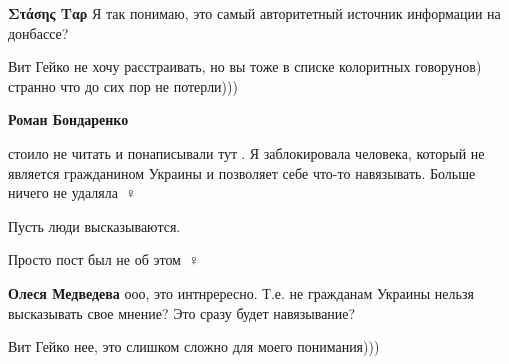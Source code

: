\begin{itemize}
\begin{itemize}
 
\textbf{Στάσης Ταρ} Я так понимаю, это самый авторитетный источник информации на донбассе?

 
Вит Гейко не хочу расстраивать, но вы тоже в списке колоритных говорунов) странно что до сих пор не потерли)))

 
\textbf{Роман Бондаренко} 

стоило не читать и понаписывали тут🤣. Я заблокировала человека, который не
является гражданином Украины и позволяет себе что-то навязывать. Больше ничего
не удаляла🤷🏼♀️

Пусть люди высказываются.

Просто пост был не об этом🤦🏼♀️

 
\textbf{Олеся Медведева} ооо, это интнрересно. Т.е. не гражданам Украины нельзя высказывать свое мнение? Это сразу будет навязывание?

 
Вит Гейко нее, это слишком сложно для моего понимания)))

 

\end{itemize}
\end{itemize}
